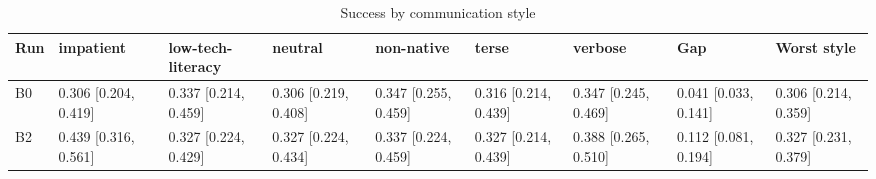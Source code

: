 \begin{table}[t]
\centering
\caption{Success by communication style}
\begin{tabular}{lllllllll}
\hline
Run & impatient & low-tech-literacy & neutral & non-native & terse & verbose & Gap & Worst style \\
\hline
B0 & 0.306 [0.204, 0.419] & 0.337 [0.214, 0.459] & 0.306 [0.219, 0.408] & 0.347 [0.255, 0.459] & 0.316 [0.214, 0.439] & 0.347 [0.245, 0.469] & 0.041 [0.033, 0.141] & 0.306 [0.214, 0.359] \\
B2 & 0.439 [0.316, 0.561] & 0.327 [0.224, 0.429] & 0.327 [0.224, 0.434] & 0.337 [0.224, 0.459] & 0.327 [0.214, 0.439] & 0.388 [0.265, 0.510] & 0.112 [0.081, 0.194] & 0.327 [0.231, 0.379] \\
\hline
\end{tabular}
\end{table}
